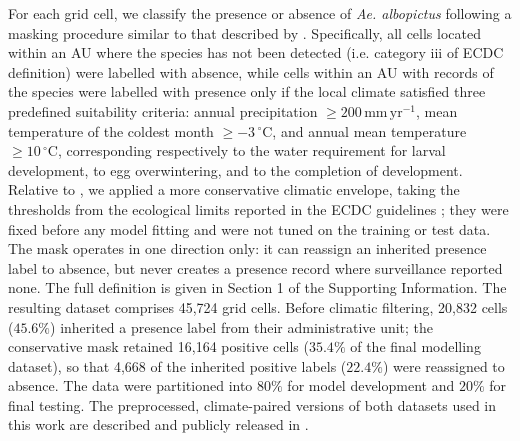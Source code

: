 \documentclass[preprint,12pt]{elsarticle}
\begin{document}
For each grid cell, we classify the presence or absence of \emph{Ae. albopictus} following a masking procedure similar to that described by \cite{zardini2024}. Specifically, all cells located within an AU where the species has not been detected (i.e. category iii of ECDC definition) were labelled with absence, while cells within an AU with records of the species were labelled with presence only if the local climate satisfied three predefined suitability criteria: annual precipitation $\geq 200\,\mathrm{mm\,yr^{-1}}$, mean temperature of the coldest month $\geq -3\,^{\circ}\mathrm{C}$, and annual mean temperature $\geq 10\,^{\circ}\mathrm{C}$, corresponding respectively to the water requirement for larval development, to egg overwintering, and to the completion of development. Relative to \cite{zardini2024}, we applied a more conservative climatic envelope, taking the thresholds from the ecological limits reported in the ECDC guidelines \cite{ecdc2024a}; they were fixed before any model fitting and were not tuned on the training or test data. The mask operates in one direction only: it can reassign an inherited presence label to absence, but never creates a presence record where surveillance reported none. The full definition is given in Section 1 of the Supporting Information.
The resulting dataset comprises 45,724 grid cells. Before climatic filtering, 20,832 cells ($45.6\%$) inherited a presence label from their administrative unit; the conservative mask retained 16,164 positive cells ($35.4\%$ of the final modelling dataset), so that 4,668 of the inherited positive labels ($22.4\%$) were reassigned to absence. The data were partitioned into $80\%$ for model development and $20\%$ for final testing. The preprocessed, climate-paired versions of both datasets used in this work are described and publicly released in \cite{biazzo2026_datasets}.
 
\end{document}
